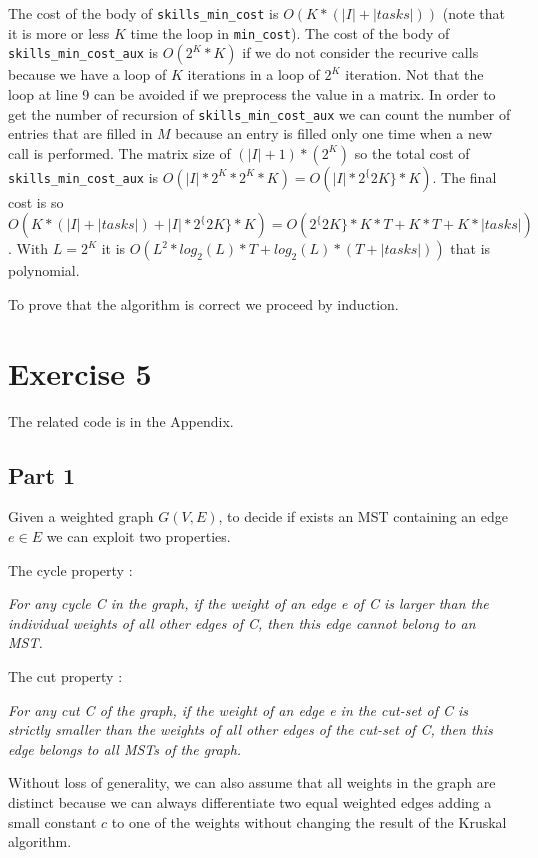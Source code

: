 \documentclass[paper=a4, fontsize=11pt]{scrartcl} %
\numberwithin{equation}{section} %
\numberwithin{figure}{section} %
\numberwithin{table}{section} %
\begin{document}
The cost of the body of \verb|skills_min_cost| is $O(K*(|I|+|tasks|))$ (note that it is more or less $K$ time the loop in \verb|min_cost|).
The cost of the body of \verb|skills_min_cost_aux| is $O(2^K*K)$ if we do not consider the recurive calls because we have a loop of $K$ iterations in a loop of $2^K$ iteration. Not that the loop at line 9 can be avoided if we preprocess the value in a matrix.
In order to get the number of recursion of \verb|skills_min_cost_aux| we can count the number of entries that are filled in $M$ because an entry is filled only one time when a new call is performed.
The matrix size of $(|I|+1)*(2^K)$ so the total cost of \verb|skills_min_cost_aux| is $O(|I|*2^K*2^K*K) = O(|I|*2^\{2K\}*K)$.
The final cost is so $O(K*(|I|+|tasks|) + |I|*2^\{2K\}*K) = O(2^\{2K\}*K*T + K*T + K*|tasks|)$. With $L = 2^K$ it is $O(L^2*log_2(L)*T + log_2(L)*(T+|tasks|))$ that is polynomial.

To prove that the algorithm is correct we proceed by induction.


\bigskip
\section*{Exercise 5}

The related code is in the Appendix.

\subsection*{Part 1}

Given a weighted graph $G(V, E)$, to decide if exists an MST containing an edge $e \in E$ we can exploit two properties.

The cycle property \cite{cicle_prop}:

\bigskip
{\em For any cycle C in the graph, if the weight of an edge e of C is larger than the individual weights of all other edges of C, then this edge cannot belong to an MST.} 
\bigskip

The cut property \cite{cut_prop}:

\bigskip
{\em For any cut C of the graph, if the weight of an edge e in the cut-set of C is strictly smaller than the weights of all other edges of the cut-set of C, then this edge belongs to all MSTs of the graph.} 
\bigskip

Without loss of generality, we can also assume that all weights in the graph are distinct because we can always differentiate two equal weighted edges adding a small constant $c$ to one of the weights without changing the result of the Kruskal algorithm.
\end{document}
